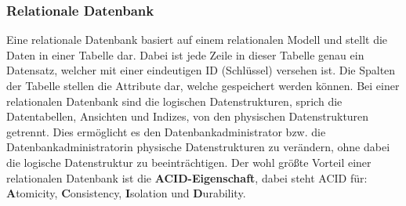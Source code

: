 \subsubsection{Relationale Datenbank}
Eine relationale Datenbank basiert auf einem relationalen Modell und stellt die Daten in einer Tabelle dar. Dabei ist jede Zeile in dieser Tabelle genau ein Datensatz, welcher mit einer eindeutigen ID (Schlüssel) versehen ist. Die Spalten der Tabelle stellen die Attribute dar, welche gespeichert werden können. Bei einer relationalen Datenbank sind die logischen Datenstrukturen, sprich die Datentabellen, Ansichten und Indizes, von den physischen Datenstrukturen getrennt. Dies ermöglicht es den Datenbankadministrator bzw. die Datenbankadministratorin physische Datenstrukturen zu verändern, ohne dabei die logische Datenstruktur zu beeinträchtigen. 
\newline
Der wohl größte Vorteil einer relationalen Datenbank ist die \textbf{ACID-Eigenschaft}, dabei steht ACID für: \textbf{A}tomicity, \textbf{C}onsistency, \textbf{I}solation und \textbf{D}urability.

